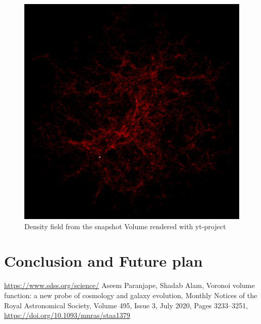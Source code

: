 \documentclass[12pt,twocolumn]{article}
\begin{document}
\begin{figure}[H]
	\centering
	\includegraphics[width=0.9\linewidth]{../density_assign/UniformGridData_Render_density}
	\caption{Density field from the snapshot \quad
		 Volume rendered with yt-project}
	\label{fig:uniformgriddatarenderdensity}
\end{figure}


\section{Conclusion and Future plan}




\begin{thebibliography}{widest entry}
 \url{https://www.sdss.org/science/}
 Aseem Paranjape, Shadab Alam, Voronoi volume function: a new probe of cosmology and galaxy evolution, Monthly Notices of the Royal Astronomical Society, Volume 495, Issue 3, July 2020, Pages 3233–3251, \url{https://doi.org/10.1093/mnras/staa1379}
\end{thebibliography}
\end{document}
